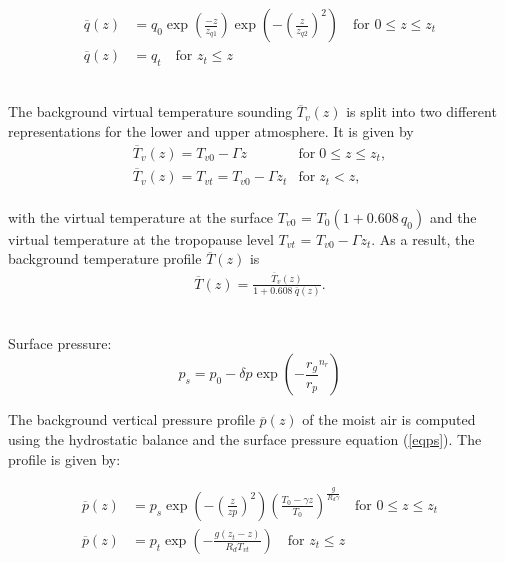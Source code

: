 \documentclass{article}
\begin{document}
\begin{equation}
\begin{split}
\overline{q}(z)&=q_0 \exp\left(\frac{-z}{z_{q1}}\right)\exp\left(-\left(\frac{z}{z_{q2}}\right)^2\right) \text{ ~~for   } 0 \leq z \leq z_t \\
\overline{q}(z)&=q_t  \text{ ~~for   }  z_t \leq z
\end{split}
\end{equation}


~\\The background virtual temperature sounding $\overline{T}_v(z)$ is split into two different representations for the lower and upper atmosphere.  It is given by
\begin{equation}
\begin{array}{ll} \label{eq2}
\overline{T}_v(z) = T_{v0} - \Gamma z & \mbox{for} \; 0 \le z \le z_t, \\
\overline{T}_v(z) = T_{vt} = T_{v0} - \Gamma z_t & \mbox{for} \; z_t < z, 
\end{array}
\end{equation}
~\\with the virtual temperature at the surface $T_{v0}$ = $T_0 (1+0.608 \, q_0)$ and the virtual temperature at the tropopause level $T_{vt}$ = $T_{v0} - \Gamma z_t$.  As a result, the background temperature profile $\overline{T}(z)$ is
\begin{eqnarray} \label{eq3}
\overline{T}(z) = \frac{\overline{T}_v(z)}{1 + 0.608\ \overline{q}(z)}.
\end{eqnarray}


~\\ Surface pressure:
\begin{equation}
p_s=p_0-\delta p \exp\left(-\frac{r_g}{r_p}^{n_r}\right)
\label{eqps}
\end{equation}

The background vertical pressure profile $\overline{p}(z)$ of the moist air is computed using the hydrostatic balance and the surface pressure equation (\ref{eqps}). The profile is given by:


\begin{equation}
\begin{split}
\overline{p}(z)&=p_s \exp\left(-\left(\frac{z}{zp}\right)^{2}\right)\left(\frac{T_0-\gamma z}{T_0}\right)^{\frac{g}{R_d\gamma}} \text{ ~~for   } 0 \leq z \leq z_t \\
\overline{p}(z)&=p_t \exp\left(-\frac{g(z_t-z)}{R_dT_{vt}}\right) \text{ ~~for   }  z_t \leq z
\end{split}
\end{equation}
\end{document}
